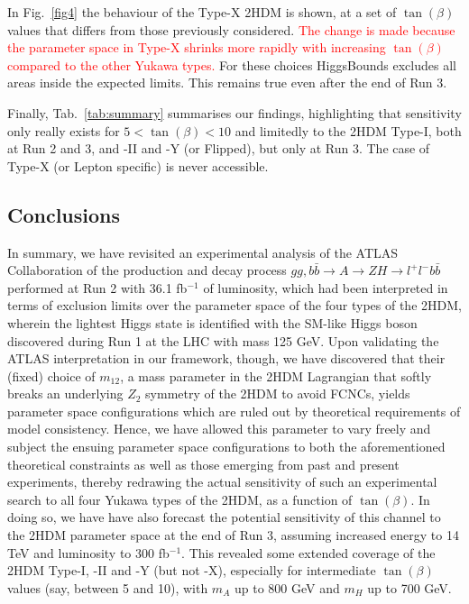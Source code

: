 In Fig.~\ref{fig4} the behaviour of the Type-X 2HDM is shown, at a set of \(\tan(\beta)\) values that differs from those previously considered.
\textcolor{red}{The change is made because the parameter space in Type-X shrinks more rapidly with increasing \(\tan(\beta)\) compared to the other Yukawa types.}
For these choices HiggsBounds excludes all areas inside the expected limits.
This remains true even after the end of Run 3.

Finally, Tab.~\ref{tab:summary} summarises our findings, highlighting that sensitivity only really exists for $5<\tan(\beta)<10$ and limitedly to the 2HDM Type-I, both at Run 2 and 3, and -II and -Y (or Flipped), but only at Run 3. The case of Type-X (or Lepton specific) is never accessible.


\subsection{Conclusions}
In summary, we have revisited an experimental analysis of the ATLAS Collaboration of the production and decay process $gg,b\bar b\to A\to ZH\to l^+l^-b\bar b$ performed at Run 2 with 36.1 fb$^{-1}$ of luminosity, which had been interpreted in terms of exclusion limits over the parameter space of the four types of the 2HDM, wherein the lightest Higgs state is identified with the SM-like Higgs boson discovered during Run 1 at the LHC with mass 125 GeV. Upon validating the ATLAS interpretation in our framework, though, we have discovered that their (fixed) choice of $m_{12}$, a mass parameter in the 2HDM Lagrangian that softly breaks an underlying $Z_2$ symmetry of the 2HDM to avoid FCNCs, yields parameter space configurations which are ruled out by theoretical requirements of model consistency. Hence, we have allowed this parameter to vary freely and subject the ensuing parameter space configurations to both the aforementioned theoretical constraints as well as those emerging from past and present experiments, thereby redrawing the actual sensitivity of such an experimental search to all four Yukawa types of the 2HDM, as a function of $\tan(\beta)$. In doing so, we have have also forecast the potential sensitivity of this channel to the 2HDM parameter space at the end of Run 3, assuming increased energy to 14 TeV and luminosity to 300 fb$^{-1}$.
This revealed some extended coverage of the 2HDM Type-I, -II and -Y (but not -X), %
especially for intermediate $\tan(\beta)$ values (say, between  5 and 10), with $m_A$ up to 800 GeV and $m_H$ up to 700 GeV.
